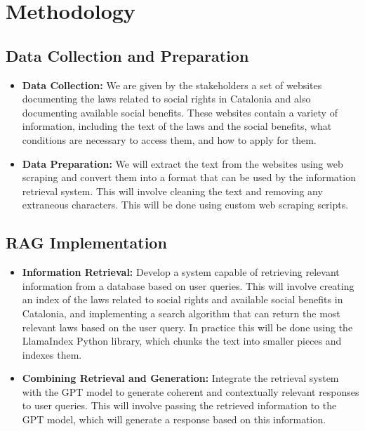 \documentclass[a4paper,12pt,twoside]{ThesisStyle}
\begin{document}
\chapter{Methodology}
\label{cap:methodology}

\section{Data Collection and Preparation}
\label{sec:data}

\begin{itemize}
  \item \textbf{Data Collection:} We are given by the stakeholders a set of websites documenting the laws related to social rights in Catalonia and also documenting available social benefits. These websites contain a variety of information, including the text of the laws and the social benefits, what conditions are necessary to access them, and how to apply for them.
  \item \textbf{Data Preparation:} We will extract the text from the websites using web scraping and convert them into a format that can be used by the information retrieval system. This will involve cleaning the text and removing any extraneous characters. This will be done using custom web scraping scripts.
\end{itemize}

\section{RAG Implementation}
\label{sec:rag-implementation}

\begin{itemize}
\item \textbf{Information Retrieval:} Develop a system capable of retrieving relevant information from a database based on user queries. This will involve creating an index of the laws related to social rights and available social benefits in Catalonia, and implementing a search algorithm that can return the most relevant laws based on the user query. In practice this will be done using the LlamaIndex Python library, which chunks the text into smaller pieces and indexes them.
  \item \textbf{Combining Retrieval and Generation:} Integrate the retrieval system with the GPT model to generate coherent and contextually relevant responses to user queries. This will involve passing the retrieved information to the GPT model, which will generate a response based on this information.
\end{itemize}
\end{document}
